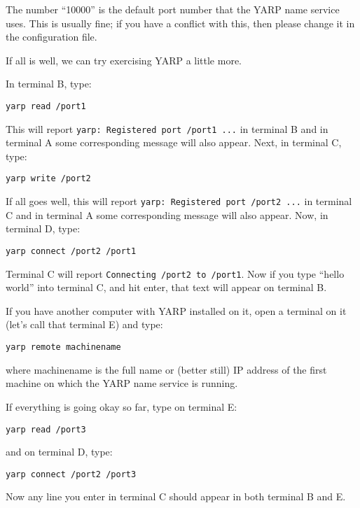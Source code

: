 \documentclass[a4]{article}
\newcommand{\ctt}[1]{{\tt #1}}
\begin{document}
The number ``10000'' is the default port number that the YARP name
service uses.  This is usually fine; if you have a conflict with this,
then please change it in the configuration file.

If all is well, we can try exercising YARP a little more.

In terminal B, type:
%
\begin{verbatim}
yarp read /port1
\end{verbatim}
%
This will report \ctt{yarp: Registered port /port1 ...} in terminal B and in
terminal A some corresponding message will also appear.
%
Next, in terminal C, type:

\begin{verbatim}
yarp write /port2
\end{verbatim}

If all goes well, this will report \ctt{yarp: Registered port /port2 ...} in
terminal C and in terminal A some corresponding message will also
appear.
%
Now, in terminal D, type:

\begin{verbatim}
yarp connect /port2 /port1
\end{verbatim}

Terminal C will report \ctt{Connecting /port2 to /port1}.  Now if
you type ``hello world'' into terminal C, and hit enter, that text
will appear on terminal B.

If you have another computer with YARP installed on it, open a
terminal on it (let's call that terminal E) and type:

\begin{verbatim}
yarp remote machinename
\end{verbatim}

where machinename is the full name or (better still) IP address of the
first machine on which the YARP name service is running.  

If everything is going okay so far, type on terminal E:
%
\begin{verbatim}
yarp read /port3
\end{verbatim}
%
and on terminal D, type:
%
\begin{verbatim}
yarp connect /port2 /port3
\end{verbatim}
%
Now any line you enter in terminal C should appear in both terminal B and E.
\end{document}
